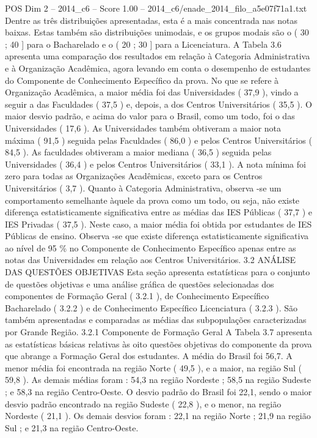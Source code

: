 \begin{textsample}{POS Dim 2 – 2014\_c6 – Score 1.00 – 2014\_c6/enade\_2014\_filo\_a5e07f71a1.txt}
Dentre as três distribuições apresentadas, esta é a mais concentrada nas notas baixas.
Estas também são distribuições unimodais, e os grupos modais são o ( 30 ; 40 ] para o Bacharelado e o ( 20 ; 30 ] para a Licenciatura.
A Tabela 3.6 apresenta uma comparação dos resultados em relação à Categoria Administrativa e à Organização Acadêmica, agora levando em conta o desempenho de estudantes do Componente de Conhecimento Específico da prova.
No que se refere à Organização Acadêmica, a maior média foi das Universidades ( 37,9 ), vindo a seguir a das Faculdades ( 37,5 ) e, depois, a dos Centros Universitários ( 35,5 ).
O maior desvio padrão, e acima do valor para o Brasil, como um todo, foi o das Universidades ( 17,6 ).
As Universidades também obtiveram a maior nota máxima ( 91,5 ) seguida pelas Faculdades ( 86,0 ) e pelos Centros Universitários ( 84,5 ).
As faculdades obtiveram a maior mediana ( 36,5 ) seguida pelas Universidades ( 36,4 ) e pelos Centros Universitários ( 33,1 ).
A nota mínima foi zero para todas as Organizações Acadêmicas, exceto para os Centros Universitários ( 3,7 ).
Quanto à Categoria Administrativa, observa -se um comportamento semelhante àquele da prova como um todo, ou seja, não existe diferença estatisticamente significativa entre as médias das IES Públicas ( 37,7 ) e IES Privadas ( 37,5 ).
Neste caso, a maior média foi obtida por estudantes de IES Públicas de ensino.
Observa -se que existe diferença estatisticamente significativa ao nível de 95 \% no Componente de Conhecimento Específico apenas entre as notas das Universidades em relação aos Centros Universitários. 3.2 ANÁLISE DAS QUESTÕES OBJETIVAS Esta seção apresenta estatísticas para o conjunto de questões objetivas e uma análise gráfica de questões selecionadas dos componentes de Formação Geral ( 3.2.1 ), de Conhecimento Específico Bacharelado ( 3.2.2 ) e de Conhecimento Específico Licenciatura ( 3.2.3 ).
São também apresentadas e comparadas as médias das subpopulações caracterizadas por Grande Região. 3.2.1 Componente de Formação Geral A Tabela 3.7 apresenta as estatísticas básicas relativas às oito questões objetivas do componente da prova que abrange a Formação Geral dos estudantes.
A média do Brasil foi 56,7.
A menor média foi encontrada na região Norte ( 49,5 ), e a maior, na região Sul ( 59,8 ).
As demais médias foram : 54,3 na região Nordeste ; 58,5 na região Sudeste ; e 58,3 na região Centro-Oeste.
O desvio padrão do Brasil foi 22,1, sendo o maior desvio padrão encontrado na região Sudeste ( 22,8 ), e o menor, na região Nordeste ( 21,1 ).
Os demais desvios foram : 22,1 na região Norte ; 21,9 na região Sul ; e 21,3 na região Centro-Oeste.

\end{textsample}
